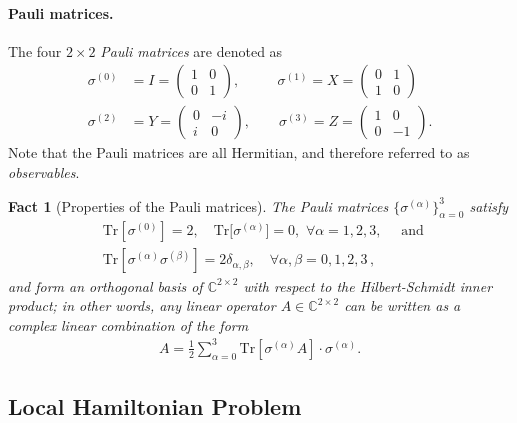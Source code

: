 \documentclass[a4paper,onecolumn,11pt]{quantumarticle}
\theoremstyle{plain}
\newtheorem{fact}[theorem]{Fact}
\begin{document}
\paragraph{Pauli matrices.} The four $2\times 2$ \emph{Pauli matrices} are denoted as
    \begin{align}
        \sigma^{(0)} &= I = \begin{pmatrix} 1 & 0 \\0 & 1 \end{pmatrix}, \quad\quad\,\,\,\,\sigma^{(1)} = X = \begin{pmatrix} 0 & 1 \\ 1 & 0 \end{pmatrix}\\ \sigma^{(2)} &= Y = \begin{pmatrix} 0 & -i \\ i & 0 \end{pmatrix}, \quad\quad \sigma^{(3)} = Z = \begin{pmatrix} 1 & 0 \\ 0 & -1 \end{pmatrix}.
    \end{align}
Note that the Pauli matrices are all Hermitian, and therefore referred to as \emph{observables}.

\begin{fact}[Properties of the Pauli matrices]\label{fact:pauli-properties}
The Pauli matrices $\{\sigma^{(\alpha)}\}_{\alpha =0}^3$ satisfy
  \begin{align}\label{trace-of-product-of-paulis}
&\mathrm{Tr}[\sigma^{(0)}]=2, \quad\mathrm{Tr}\big[\sigma^{(\alpha)}\big]= 0, \,\, \forall\alpha =1,2,3, \quad \text{ and }\\
&\mathrm{Tr}\left[\sigma^{(\alpha)} \sigma^{(\beta)}\right] =  2 \delta_{\alpha,\beta}, \quad \forall \alpha,\beta =0,1,2,3\, ,
    \end{align}
and form an orthogonal basis of $\mathbb{C}^{2 \times 2}$ with respect to the Hilbert-Schmidt inner product; in other words, any linear operator $A \in \mathbb{C}^{2 \times 2}$ can be written as a complex linear combination of the form
\begin{align}
A = \frac{1}{2}\sum_{\alpha=0}^3  \mathrm{Tr}\left[\sigma^{(\alpha)} A\right] \cdot \sigma^{(\alpha)}.
\end{align}
\end{fact}

\subsection{Local Hamiltonian Problem}
\end{document}
